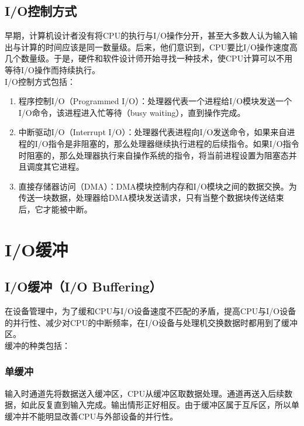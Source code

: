 \vspace{0.5cm}

\subsection{I/O控制方式}

早期，计算机设计者没有将CPU的执行与I/O操作分开，甚至大多数人认为输入输出与计算的时间应该是同一数量级。后来，他们意识到，CPU要比I/O操作速度高几个数量级。于是，硬件和软件设计师开始寻找一种技术，使CPU计算可以不用等待I/O操作而持续执行。\\

I/O控制方式包括：

\begin{enumerate}
	\item 程序控制I/O（Programmed I/O）：处理器代表一个进程给I/O模块发送一个I/O命令，该进程进入忙等待（busy waiting），直到操作完成。

	\item 中断驱动I/O（Interrupt I/O）：处理器代表进程向I/O发送命令，如果来自进程的I/O指令是非阻塞的，那么处理器继续执行进程的后续指令。如果I/O指令时阻塞的，那么处理器执行来自操作系统的指令，将当前进程设置为阻塞态并且调度其它进程。

	\item 直接存储器访问（DMA）：DMA模块控制内存和I/O模块之间的数据交换。为传送一块数据，处理器给DMA模块发送请求，只有当整个数据块传送结束后，它才能被中断。
\end{enumerate}

\newpage

\section{I/O缓冲}

\subsection{I/O缓冲（I/O Buffering）}

在设备管理中，为了缓和CPU与I/O设备速度不匹配的矛盾，提高CPU与I/O设备的并行性、减少对CPU的中断频率，在I/O设备与处理机交换数据时都用到了缓冲区。\\

缓冲的种类包括：

\subsubsection{单缓冲}

输入时通道先将数据送入缓冲区，CPU从缓冲区取数据处理。通道再送入后续数据，如此反复直到输入完成。输出情形正好相反。由于缓冲区属于互斥区，所以单缓冲并不能明显改善CPU与外部设备的并行性。

